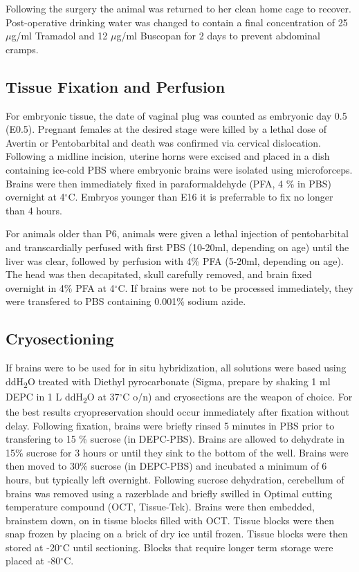 \documentclass[onehalf,12pt]{beavtex}
\begin{document}
  Following the surgery the animal was returned to her clean home cage to
  recover. Post-operative drinking water was changed to contain a final
  concentration of 25 \(\mu\)g/ml Tramadol and 12 \(\mu\)g/ml Buscopan for
  2 days to prevent abdominal cramps.
  
  \subsection{Tissue Fixation and
  Perfusion}\label{tissue-fixation-and-perfusion}
  
  For embryonic tissue, the date of vaginal plug was counted as embryonic
  day 0.5 (E0.5). Pregnant females at the desired stage were killed by a
  lethal dose of Avertin or Pentobarbital and death was confirmed via
  cervical dislocation. Following a midline incision, uterine horns were
  excised and placed in a dish containing ice-cold PBS where embryonic
  brains were isolated using microforceps. Brains were then immediately
  fixed in paraformaldehyde (PFA, 4 \% in PBS) overnight at 4\(^\circ\)C.
  Embryos younger than E16 it is preferrable to fix no longer than 4
  hours.
  
  For animals older than P6, animals were given a lethal injection of
  pentobarbital and transcardially perfused with first PBS (10-20ml,
  depending on age) until the liver was clear, followed by perfusion with
  4\% PFA (5-20ml, depending on age). The head was then decapitated, skull
  carefully removed, and brain fixed overnight in 4\% PFA at 4\(^\circ\)C.
  If brains were not to be processed immediately, they were transfered to
  PBS containing 0.001\% sodium azide.
  
  \subsection{Cryosectioning}\label{cryosectioning}
  
  If brains were to be used for in situ hybridization, all solutions were
  based using ddH\textsubscript{2}O treated with Diethyl pyrocarbonate
  (Sigma, prepare by shaking 1 ml DEPC in 1 L ddH\textsubscript{2}O at
  37\(^\circ\)C o/n) and cryosections are the weapon of choice. For the
  best results cryopreservation should occur immediately after fixation
  without delay. Following fixation, brains were briefly rinsed 5 minutes
  in PBS prior to transfering to 15 \% sucrose (in DEPC-PBS). Brains are
  allowed to dehydrate in 15\% sucrose for 3 hours or until they sink to
  the bottom of the well. Brains were then moved to 30\% sucrose (in
  DEPC-PBS) and incubated a minimum of 6 hours, but typically left
  overnight. Following sucrose dehydration, cerebellum of brains was
  removed using a razerblade and briefly swilled in Optimal cutting
  temperature compound (OCT, Tissue-Tek). Brains were then embedded,
  brainstem down, on in tissue blocks filled with OCT. Tissue blocks were
  then snap frozen by placing on a brick of dry ice until frozen. Tissue
  blocks were then stored at -20\(^\circ\)C until sectioning. Blocks that
  require longer term storage were placed at -80\(^\circ\)C.
  
\end{document}
